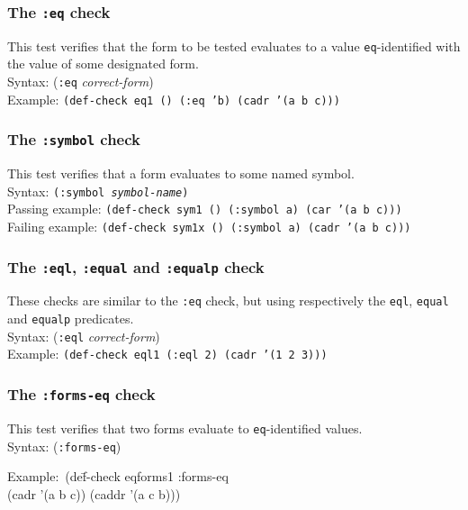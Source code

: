 \documentclass{article}
\begin{document}
\subsubsection{The \texttt{:eq} check} 
This test verifies that the form to be tested evaluates to a value
\texttt{eq}-identified with the value of some designated
form.
\\ Syntax: (\texttt{:eq} \textit{correct-form})
\\ Example: \texttt{(def-check eq1 () (:eq 'b) (cadr '(a b c)))}

\subsubsection{The \texttt{:symbol} check} 
This test verifies that a form evaluates to some named
symbol.
\\ Syntax: \texttt{(:symbol \emph{symbol-name})}
\\ Passing example: \texttt{(def-check sym1  () (:symbol a) (car '(a b c)))}
\\ Failing example: \texttt{(def-check sym1x () (:symbol a) (cadr '(a b c)))}

\subsubsection{The \texttt{:eql}, \texttt{:equal} and \texttt{:equalp} check} 
These checks are similar to the \texttt{:eq} check, but using
respectively the \texttt{eql}, \texttt{equal} and \texttt{equalp}
predicates.
\\ Syntax: (\texttt{:eql} \textit{correct-form})
\\ Example: \texttt{(def-check eql1 (:eql 2) (cadr '(1 2 3)))}

\subsubsection{The \texttt{:forms-eq} check} 
This test verifies that two forms evaluate to \texttt{eq}-identified
values.
\\ Syntax: (\texttt{:forms-eq})
{\ttfamily\begin{tabbing}
\textrm{Example:}\ (de\=f-check eqforms1 :forms-eq
\\ \>  (cadr '(a b c)) (caddr '(a c b)))
\end{tabbing}}
\end{document}
